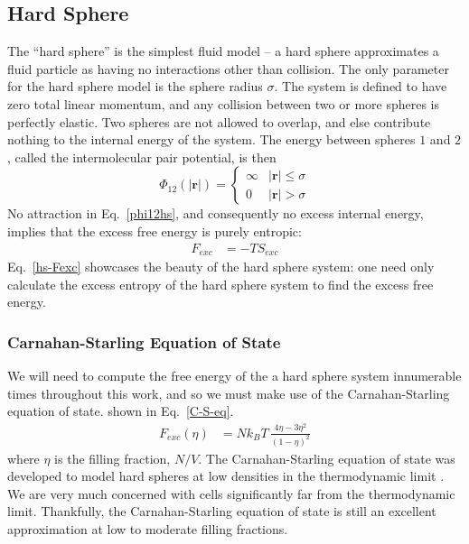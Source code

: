 \documentclass[12pt]{article}
\renewcommand{\vec}[1]{\mathbf{#1}}
\begin{document}
\subsection{Hard Sphere}
The ``hard sphere'' is the simplest fluid model -- a hard sphere approximates a fluid particle as having no interactions other than collision. The only parameter for the hard sphere model is the sphere radius $\sigma$. The system is defined to have zero total linear momentum, and any collision between two or more spheres is perfectly elastic. Two spheres are not allowed to overlap, and else contribute nothing to the internal energy of the system. The energy between spheres $1$ and $2$, called the intermolecular pair potential, is then
\begin{equation} 
    \Phi_{12}(|\vec{r}|) = \begin{cases}\infty & |\vec{r}|\leq \sigma\\ 0 & |\vec{r}| > \sigma \end{cases}
\label{phi12hs}
\end{equation}
No attraction in Eq.~\ref{phi12hs}, and consequently no excess internal energy, implies that the excess free energy is purely entropic: 
\begin{align}
    F_{exc} &= -T S_{exc}
    \label{hs-fexc}
\end{align}
Eq.~\ref{hs-Fexc} showcases the beauty of the hard sphere system: one need only calculate the excess entropy of the hard sphere system to find the excess free energy.   
\subsubsection{Carnahan-Starling Equation of State}
We will need to compute the free energy of the a hard sphere system innumerable times throughout this work, and so we must make use of the Carnahan-Starling equation of state. shown in Eq.~\ref{C-S-eq}.
\begin{align}
    F_{exc}(\eta) &= N k_B T\,\frac{4\eta - 3\eta^2}{(1-\eta)^2}
    \label{C-S-eq}  
\end{align} 
where $\eta$ is the filling fraction, $N/V$. The Carnahan-Starling equation of state was developed to model hard spheres at low densities in the thermodynamic limit \cite{cs-eos}. We are very much concerned with cells significantly far from the thermodynamic limit. Thankfully, the Carnahan-Starling equation of state is still an excellent approximation at low to moderate filling fractions.\\ 
\end{document}
